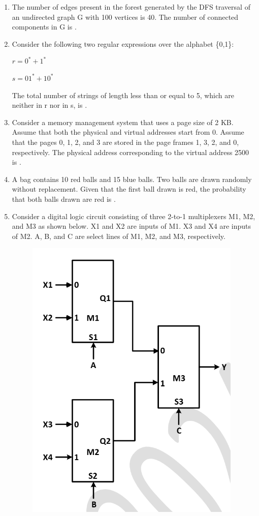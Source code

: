\documentclass[a4paper, 11pt]{article}
\begin{document}
\begin{enumerate}
    \hfill{}

    \item The number of edges present in the forest generated by the DFS traversal of an undirected graph G with 100 vertices is 40. The number of connected components in G is \underline{\hspace{2cm}}.
    
    \hfill{}

    \item Consider the following two regular expressions over the alphabet \{0,1\}:
    \begin{center}
    $r = 0^* + 1^*$
    
    $s = 01^* + 10^*$
    \end{center}
    
    
    The total number of strings of length less than or equal to 5, which are neither in r nor in s, is \underline{\hspace{2cm}}.

    \hfill{}

    \item Consider a memory management system that uses a page size of 2 KB. Assume that both the physical and virtual addresses start from 0. Assume that the pages 0, 1, 2, and 3 are stored in the page frames 1, 3, 2, and 0, respectively. The physical address  corresponding to the virtual address 2500  is \underline{\hspace{2cm}}.

    \hfill{}

    \item A bag contains 10 red balls and 15 blue balls. Two balls are drawn randomly without replacement. Given that the first ball drawn is red, the probability  that both balls drawn are red is \underline{\hspace{2cm}}.

    \hfill{}

    \item Consider a digital logic circuit consisting of three 2-to-1 multiplexers M1, M2, and M3 as shown below. X1 and X2 are inputs of M1. X3 and X4 are inputs of M2. A, B, and C are select lines of M1, M2, and M3, respectively.
    
    \begin{figure}[H]
        \centering
        \includegraphics[width=0.3\columnwidth]{figs/q64.png}
        \caption*{}
        \label{fig:q64}
    \end{figure}
    

\end{enumerate}
\end{document}
